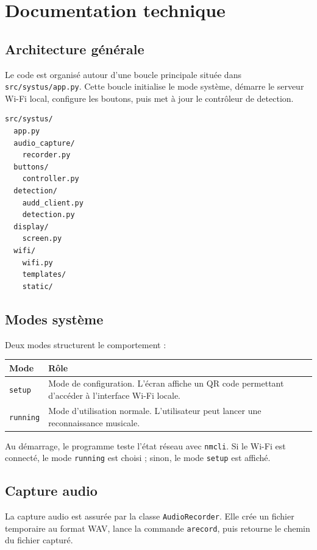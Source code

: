 \section{Documentation technique}

\subsection{Architecture générale}

Le code est organisé autour d'une boucle principale située dans
\texttt{src/systus/app.py}. Cette boucle initialise le mode système, démarre le
serveur Wi-Fi local, configure les boutons, puis met à jour le contrôleur de
detection.

\begin{lstlisting}
src/systus/
  app.py
  audio_capture/
    recorder.py
  buttons/
    controller.py
  detection/
    audd_client.py
    detection.py
  display/
    screen.py
  wifi/
    wifi.py
    templates/
    static/
\end{lstlisting}

\subsection{Modes système}

Deux modes structurent le comportement :

\begin{longtable}{|p{3cm}|p{10cm}|}
\hline
\textbf{Mode} & \textbf{Rôle} \\
\hline
\texttt{setup} & Mode de configuration. L'écran affiche un QR code permettant d'accéder à l'interface Wi-Fi locale. \\
\hline
\texttt{running} & Mode d'utilisation normale. L'utilisateur peut lancer une reconnaissance musicale. \\
\hline
\end{longtable}

Au démarrage, le programme teste l'état réseau avec \texttt{nmcli}. Si le Wi-Fi
est connecté, le mode \texttt{running} est choisi ; sinon, le mode
\texttt{setup} est affiché.

\subsection{Capture audio}

La capture audio est assurée par la classe \texttt{AudioRecorder}. Elle crée un
fichier temporaire au format WAV, lance la commande \texttt{arecord}, puis
retourne le chemin du fichier capturé.

